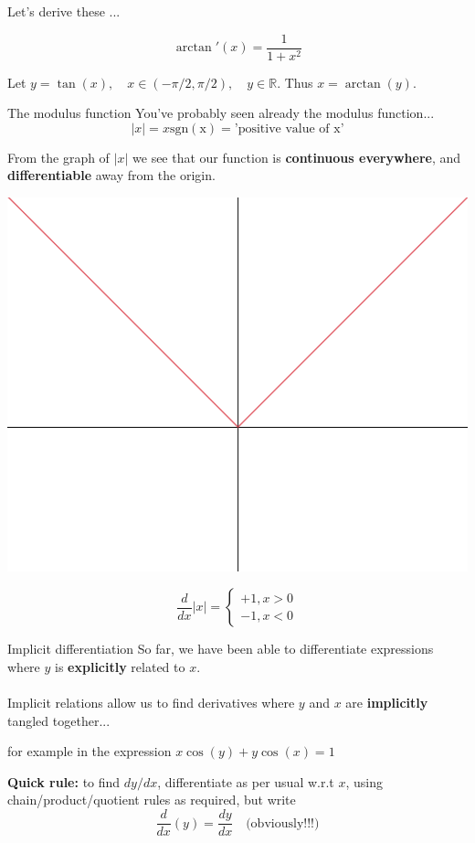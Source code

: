 \documentclass{beamer}
\begin{document}
\begin{frame}
	Let's derive these ...
	
	$$\arctan'(x) = \dfrac{1}{1+x^2}$$
	
	Let $y = \tan(x), \quad x \in (-\pi/2, \pi/2), \quad y \in \mathbb{R}$. Thus $x = \arctan(y)$.
	\vspace{5cm}
\end{frame}

\begin{frame}{The modulus function}
	You've probably seen already the modulus function...
	$$|x| = x\mathrm{sgn(x)} = \text{'positive value of x'}$$
	
	From the graph of $|x|$ we see that our function is \textbf{continuous everywhere}, and \textbf{differentiable} away from the origin.
	
	\begin{center}\includegraphics[scale=0.10]{img/abs.png}\end{center}
	
	$$\dfrac{d}{dx} |x| = \begin{cases}+1, x > 0\\ -1, x < 0\end{cases}$$
\end{frame}

\begin{frame}{Implicit differentiation}
	So far, we have been able to differentiate expressions where $y$ is \textbf{explicitly} related to $x$.
	\\~\\	
	Implicit relations allow us to find derivatives where $y$ and $x$ are \textbf{implicitly} tangled together... 
	\begin{center}for example in the expression $x \cos(y) + y\cos(x) = 1$\end{center}
	
	\textbf{Quick rule: } to find $dy/dx$, differentiate as per usual w.r.t $x$, using chain/product/quotient rules as required, but write 
	$$\dfrac{d}{dx}(y) = \dfrac{dy}{dx} \quad \text{(obviously!!!)}$$
\end{frame}
\end{document}

